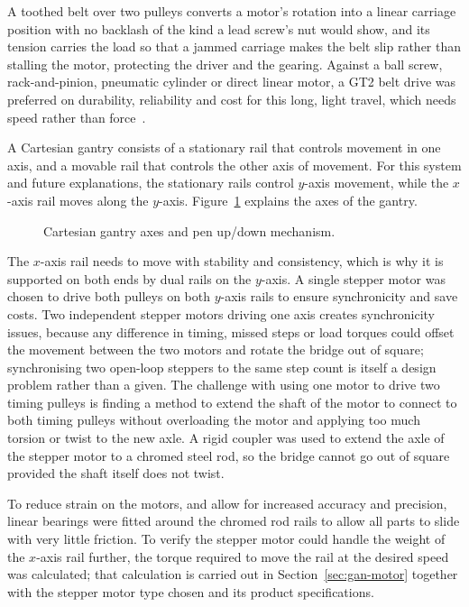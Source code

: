 A toothed belt over two pulleys converts a motor's rotation into a linear carriage position with no backlash of the kind a lead screw's nut would show, and its tension carries the load so that a jammed carriage makes the belt slip rather than stalling the motor, protecting the driver and the gearing. Against a ball screw, rack-and-pinion, pneumatic cylinder or direct linear motor, a GT2 belt drive was preferred on durability, reliability and cost for this long, light travel, which needs speed rather than force~\cite{iqs2024}.

A Cartesian gantry consists of a stationary rail that controls movement in one axis, and a movable rail that controls the other axis of movement. For this system and future explanations, the stationary rails control $y$-axis movement, while the $x$-axis rail moves along the $y$-axis. Figure~\ref{fig:gantry-axis-diagram} explains the axes of the gantry.

\begin{figure}[!htbp]
    \centering
    \caption{Cartesian gantry axes and pen up/down mechanism.}
    \label{fig:gantry-axis-diagram}
\end{figure}

The $x$-axis rail needs to move with stability and consistency, which is why it is supported on both ends by dual rails on the $y$-axis. A single stepper motor was chosen to drive both pulleys on both $y$-axis rails to ensure synchronicity and save costs. Two independent stepper motors driving one axis creates synchronicity issues, because any difference in timing, missed steps or load torques could offset the movement between the two motors and rotate the bridge out of square; synchronising two open-loop steppers to the same step count is itself a design problem rather than a given. The challenge with using one motor to drive two timing pulleys is finding a method to extend the shaft of the motor to connect to both timing pulleys without overloading the motor and applying too much torsion or twist to the new axle. A rigid coupler was used to extend the axle of the stepper motor to a chromed steel rod, so the bridge cannot go out of square provided the shaft itself does not twist.

To reduce strain on the motors, and allow for increased accuracy and precision, linear bearings were fitted around the chromed rod rails to allow all parts to slide with very little friction. To verify the stepper motor could handle the weight of the $x$-axis rail further, the torque required to move the rail at the desired speed was calculated; that calculation is carried out in Section~\ref{sec:gan-motor} together with the stepper motor type chosen and its product specifications.

